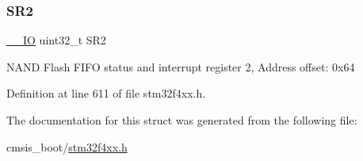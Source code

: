 \subsubsection{\texorpdfstring{S\+R2}{SR2}}
{\footnotesize\ttfamily \hyperlink{group___c_m_s_i_s__core__definitions_gaec43007d9998a0a0e01faede4133d6be}{\+\_\+\+\_\+\+IO} uint32\+\_\+t S\+R2}

N\+A\+ND Flash F\+I\+FO status and interrupt register 2, Address offset\+: 0x64 

Definition at line 611 of file stm32f4xx.\+h.



The documentation for this struct was generated from the following file\+:\begin{DoxyCompactItemize}
\item 
cmsis\+\_\+boot/\hyperlink{stm32f4xx_8h}{stm32f4xx.\+h}\end{DoxyCompactItemize}
